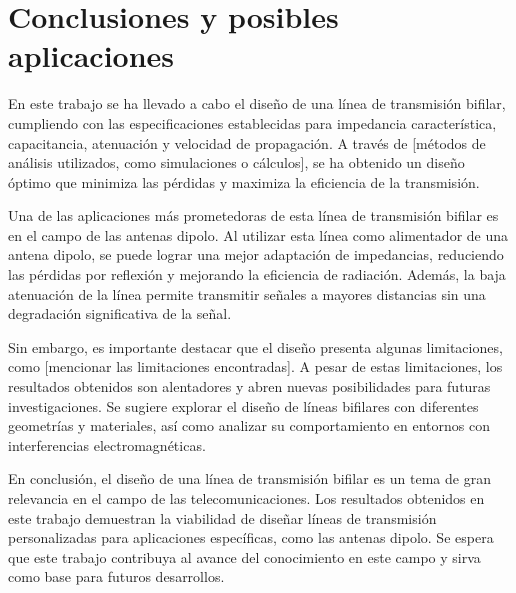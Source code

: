 \section{Conclusiones y posibles aplicaciones}

En este trabajo se ha llevado a cabo el diseño de una línea de transmisión bifilar, cumpliendo con las especificaciones establecidas para impedancia característica, capacitancia, atenuación y velocidad de propagación. A través de [métodos de análisis utilizados, como simulaciones o cálculos], se ha obtenido un diseño óptimo que minimiza las pérdidas y maximiza la eficiencia de la transmisión.

Una de las aplicaciones más prometedoras de esta línea de transmisión bifilar es en el campo de las antenas dipolo. Al utilizar esta línea como alimentador de una antena dipolo, se puede lograr una mejor adaptación de impedancias, reduciendo las pérdidas por reflexión y mejorando la eficiencia de radiación. Además, la baja atenuación de la línea permite transmitir señales a mayores distancias sin una degradación significativa de la señal.

Sin embargo, es importante destacar que el diseño presenta algunas limitaciones, como [mencionar las limitaciones encontradas]. A pesar de estas limitaciones, los resultados obtenidos son alentadores y abren nuevas posibilidades para futuras investigaciones. Se sugiere explorar el diseño de líneas bifilares con diferentes geometrías y materiales, así como analizar su comportamiento en entornos con interferencias electromagnéticas.

En conclusión, el diseño de una línea de transmisión bifilar es un tema de gran relevancia en el campo de las telecomunicaciones. Los resultados obtenidos en este trabajo demuestran la viabilidad de diseñar líneas de transmisión personalizadas para aplicaciones específicas, como las antenas dipolo. Se espera que este trabajo contribuya al avance del conocimiento en este campo y sirva como base para futuros desarrollos.



\pagebreak
